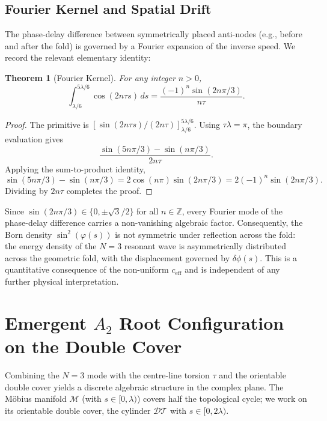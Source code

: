 \documentclass[11pt,a4paper]{article}
\newtheorem{theorem}{Theorem}
\begin{document}
\subsection{Fourier Kernel and Spatial Drift}
The phase-delay difference between symmetrically placed anti-nodes (e.g., before and after the fold) is governed by a Fourier expansion of the inverse speed. We record the relevant elementary identity:

\begin{theorem}[Fourier Kernel]
\label{thm:fourier}
For any integer $n > 0$,
\begin{equation}
\int_{\lambda/6}^{5\lambda/6} \cos(2n\tau s)\, ds = \frac{(-1)^n \sin(2n\pi/3)}{n\tau}.
\end{equation}
\end{theorem}

\begin{proof}
The primitive is $[\sin(2n\tau s)/(2n\tau)]_{\lambda/6}^{5\lambda/6}$. Using $\tau\lambda = \pi$, the boundary evaluation gives
\begin{equation*}
\frac{\sin(5n\pi/3) - \sin(n\pi/3)}{2n\tau}.
\end{equation*}
Applying the sum-to-product identity,
\begin{equation*}
\sin(5n\pi/3) - \sin(n\pi/3) = 2 \cos(n\pi) \sin(2n\pi/3) = 2(-1)^n \sin(2n\pi/3).
\end{equation*}
Dividing by $2n\tau$ completes the proof.
\end{proof}

Since $\sin(2n\pi/3)\in\{0,\pm\sqrt{3}/2\}$ for all $n\in\mathbb Z$, every Fourier mode of the phase-delay difference carries a non-vanishing algebraic factor. Consequently, the Born density $\sin^{2}(\varphi(s))$ is not symmetric under reflection across the fold: the energy density of the $N=3$ resonant wave is asymmetrically distributed across the geometric fold, with the displacement governed by $\delta\phi(s)$. This is a quantitative consequence of the non-uniform $c_{\text{eff}}$ and is independent of any further physical interpretation.

\section{Emergent $A_2$ Root Configuration on the Double Cover}

Combining the $N=3$ mode with the centre-line torsion $\tau$ and the orientable double cover yields a discrete algebraic structure in the complex plane. The M\"obius manifold $\mathcal{M}$ (with $s\in[0,\lambda)$) covers half the topological cycle; we work on its orientable double cover, the cylinder $\mathcal{DT}$ with $s\in[0,2\lambda)$.
\end{document}
